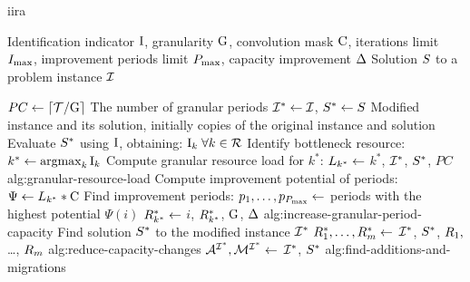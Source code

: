 \begin{algorithm}[t]
\caption{\acf{iira}}
\label{alg:identification-indicator-relaxing-algorithm}
\begin{algorithmic}[1]

\Params  Identification indicator $\mathrm{I}$, granularity $\mathrm{G}$, convolution mask $\mathrm{C}$,
\Paramsc iterations limit $\algMaxiter$, improvement periods limit $P_{\max}$,
\Paramsc capacity improvement $\Delta$
\Input  Solution $S$ to a problem instance $\mathcal{I}$

\State $PC \gets \lceil \mathcal{T} / \mathrm{G} \rceil$
       \Comment The number of granular periods
\State $\mathcal{I}^* \gets \mathcal{I}$, $S^* \gets S$
       \Comment Modified instance and its solution, initially
       \Statecr copies of the original instance and solution
\Repeat \label{alg:iira/repeat}
    \State Evaluate $S^*$ using $\mathrm{I}$, obtaining:
           $\mathrm{I}_k \;\forall k \in \mathcal{R}$ \label{alg:iira/evaluation}
    \State Identify bottleneck resource:
           $k^* \gets \operatorname*{\operatorname{argmax}}_k \mathrm{I}_k$ \label{alg:iira/identification}
    \State Compute granular resource load for $k^*$: \label{alg:iira/granular-load}
     $L_{k^*} \gets $ %
                                                   {$k^*$, $\mathcal{I}^*$, $S^*$, $PC$}%
                                                   {alg:granular-resource-load}
    \State Compute improvement potential of periods: $\Psi \gets L_{k^*} * \mathrm{C}$ \label{alg:iira/convolution}
    \State Find improvement periods: \label{alg:iira/periods}
     $p_1, \dots, p_{P_{\max}} \gets$
            periods with the highest potential $\Psi(i)$
        \State $R_{k^*}^* \gets$ %
                                                 {$i$, $R_{k^*}^*$, $\mathrm{G}$, $\Delta$}%
                                                 {alg:increase-granular-period-capacity} \label{alg:iira/capacity-increase}
    \EndFor
    \State Find solution $S^*$ to the modified instance $\mathcal{I}^*$ \label{alg:iira/modified-solution}
    \State $R_{1}^*, \dots, R_{m}^* \gets$ %
                                                                   {$\mathcal{I}^*$, $S^*$, $R_{1},$ \dots, $R_{m}$}%
                                                                   {alg:reduce-capacity-changes} \label{alg:iira/reduction}
    \State $\mathcal{A}^{\mathcal{I}^*}, \mathcal{M}^{\mathcal{I}^*} \gets $
                   {$\mathcal{I}^*$, $S^*$}%
                   {alg:find-additions-and-migrations} \label{alg:iira/additions-migrations}
\ForIter{$\algMaxiter$} \label{alg:iira/for-iters}


\end{algorithmic}
\end{algorithm}
